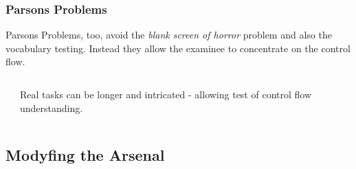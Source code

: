 \begin{frame}
  \frametitle{Parsons Problems}
  Parsons Problems, too, avoid the \emph{blank screen of horror} problem and also the vocabulary testing. Instead they allow the examinee to concentrate on the control flow.
  \vspace{-.5em}
  \begin{columns}
    \begin{column}{.7\textwidth}
    \end{column}
    \begin{column}{.3\textwidth}
      Real tasks can be longer and intricated - allowing test of control flow understanding.
    \end{column}
  \end{columns}
  \vspace{-.5em}
\end{frame}

\subsection{Modyfing the Arsenal}

